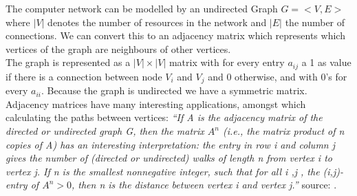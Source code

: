 %




The computer network can be modelled by an undirected Graph $G = < V, E> $ where $|V|$ denotes the number of resources in the network and $|E|$ the number of connections. We can convert this to an adjacency matrix which represents which vertices of the graph are neighbours of other vertices. \\
The graph is represented as a $|V| \times |V|$ matrix with for every entry $a_{ij}$ a 1 as value if there is a connection between node $V_{i}$ and $V_{j}$ and 0 otherwise, and with 0's for every $a_{ii}$. Because the graph is undirected we have a symmetric matrix.  \\ 

Adjacency matrices have many interesting applications, amongst which calculating the paths between vertices:
\textit{``If \textit{A} is the adjacency matrix of the directed or undirected graph \textit{G}, then the matrix $A^{n}$ (i.e., the matrix product of \textit{n} copies of \textit{A}) has an interesting interpretation: the entry in row \textit{i} and column \textit{j} gives the number of (directed or undirected) walks of length \textit{n} from vertex \textit{i} to vertex \textit{j}. If \textit{n} is the smallest nonnegative integer, such that for all i ,j , the (i,j)-entry of $A^{n} > 0$, then n is the distance between vertex i and vertex \textit{j}.''}  source: \cite{wikimatrix} .\\


